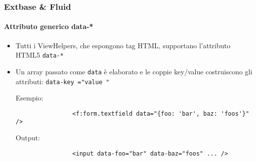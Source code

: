 \begin{frame}[fragile]
	\frametitle{Extbase \& Fluid}
	\framesubtitle{Attributo generico data-*}


	\begin{itemize}
		\item Tutti i ViewHelpers, che espongono tag HTML, supportano l'attributo HTML5 \texttt{data-*}
		\item Un array passato come \texttt{data} è elaborato e le coppie key/value costruiscono gli attributi:
			\texttt{data-\begingroup\color{typo3orange}key\endgroup
				="\begingroup\color{typo3orange}value\endgroup
				"}\newline

			Esempio:
			\begin{lstlisting}
				<f:form.textfield data="{foo: 'bar', baz: 'foos'}" />
			\end{lstlisting}

			Output:
			\begin{lstlisting}
				<input data-foo="bar" data-baz="foos" ... />
			\end{lstlisting}
		
	\end{itemize}

\end{frame}



